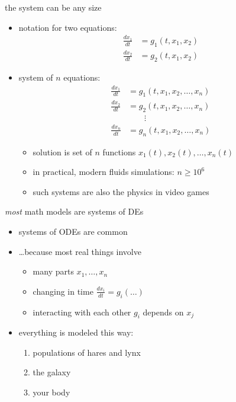 \documentclass[dvipsnames,colorlinks]{beamer}
\begin{document}
\begin{frame}{the system can be any size}

\begin{itemize}
\item notation for two equations:
\footnotesize
\begin{align*}
\frac{dx_1}{dt} &= g_1(t,x_1,x_2) \\
\frac{dx_2}{dt} &= g_2(t,x_1,x_2)
\end{align*}
\normalsize
\item system of $n$ equations:
\alert{
\begin{align*}
\frac{dx_1}{dt} &= g_1(t,x_1,x_2,\dots,x_n) \\
\frac{dx_2}{dt} &= g_2(t,x_1,x_2,\dots,x_n) \\
                &\qquad \vdots \\
\frac{dx_n}{dt} &= g_n(t,x_1,x_2,\dots,x_n)
\end{align*}
}
    \vspace{-2mm}
    \begin{itemize}
    \item solution is set of $n$ functions $x_1(t),x_2(t),\dots,x_n(t)$
    \item in practical, modern fluids simulations: $n\ge 10^6$
    \item such systems are also the physics in video games
    \end{itemize}
\end{itemize}
\end{frame}


\begin{frame}{\emph{most} math models are systems of DEs}

\begin{itemize}
\item systems of ODEs are \alert{common}
\item \dots because most real things involve

    \begin{itemize}
    \item \alert{many parts} \hfill $x_1,\dots,x_n$

\medskip
    \item \alert{changing in time} \hfill $\frac{dx_i}{dt}=g_i(\dots)$

\medskip
    \item \alert{interacting with each other} \hfill $g_i$ depends on $x_j$
    \end{itemize}

\bigskip
\item everything is modeled this way:
    \begin{enumerate}
    \item populations of hares and lynx
    \item the galaxy
    \item your body
    \end{enumerate}
\end{itemize}
\end{frame}
\end{document}
